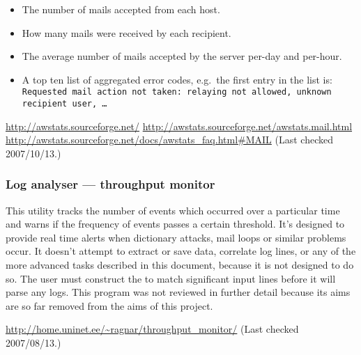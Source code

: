 \begin{itemize}

    \item The number of mails accepted from each host.

    \item How many mails were received by each recipient.
        
    \item The average number of mails accepted by the server per-day and
        per-hour.

    \item A top ten list of aggregated \SMTP{} error codes, e.g.\ the first
        entry in the list is: \texttt{Requested mail action not taken:
        relaying not allowed, unknown recipient user, \ldots}

\end{itemize}


\noindent\url{http://awstats.sourceforge.net/} \newline
\url{http://awstats.sourceforge.net/awstats.mail.html} \newline
\url{http://awstats.sourceforge.net/docs/awstats_faq.html#MAIL}
\newline (Last checked 2007/10/13.)

\subsubsection{Log analyser --- throughput monitor}

This utility tracks the number of events which occurred over a particular
time and warns if the frequency of events passes a certain threshold.  It's
designed to provide real time alerts when dictionary attacks, mail loops or
similar problems occur. It doesn't attempt to extract or save data,
correlate log lines, or any of the more advanced tasks described in this
document, because it is not designed to do so.  The user must construct the
\regexes{} to match significant input lines before it will parse any logs.
This program was not reviewed in further detail because its aims are so far
removed from the aims of this project.

\url{http://home.uninet.ee/~ragnar/throughput_monitor/} \newline (Last
checked 2007/08/13.)

